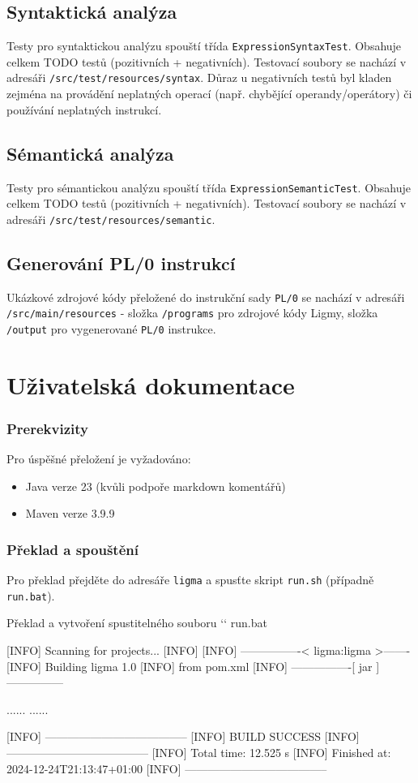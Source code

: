 \documentclass[czech, oth, kiv, he, iso690numb, viewonly]{fasthesis}
\begin{document}
\section{Syntaktická analýza}
Testy pro syntaktickou analýzu spouští třída \texttt{ExpressionSyntaxTest}. Obsahuje celkem TODO testů (pozitivních + negativních). Testovací
soubory se nachází v adresáři \texttt{/src/test/resources/syntax}. Důraz u negativních testů byl kladen zejména na provádění neplatných operací 
(např. chybějící operandy/operátory) či používání neplatných instrukcí. 
\section{Sémantická analýza}
Testy pro sémantickou analýzu spouští třída \texttt{ExpressionSemanticTest}. Obsahuje celkem TODO testů (pozitivních + negativních).
Testovací soubory se nachází v adresáři \texttt{/src/test/resources/semantic}.
\section{Generování PL/0 instrukcí}
Ukázkové zdrojové kódy přeložené do instrukční sady \texttt{PL/0} se nachází v adresáři \texttt{/src/main/resources} - složka \texttt{/programs}
pro zdrojové kódy Ligmy, složka \texttt{/output} pro vygenerované \texttt{PL/0} instrukce.

\chapter{Uživatelská dokumentace}
\subsection{Prerekvizity}
Pro úspěšné přeložení je vyžadováno:
\begin{itemize}
    \item Java verze 23 (kvůli podpoře markdown komentářů)
    \item Maven verze 3.9.9
\end{itemize}

\subsection{Překlad a spouštění}
Pro překlad přejděte do adresáře \texttt{ligma} a spusťte skript \texttt{run.sh} (případně \texttt{run.bat}).

\begin{console}{Překlad a vytvoření spustitelného souboru}
`\winprompt` run.bat

[INFO] Scanning for projects...
[INFO]
[INFO] ----------------< ligma:ligma >-------
[INFO] Building ligma 1.0
[INFO]   from pom.xml
[INFO] ----------------[ jar ]---------------

......
......

[INFO] --------------------------------------
[INFO] BUILD SUCCESS
[INFO] --------------------------------------
[INFO] Total time:  12.525 s
[INFO] Finished at: 2024-12-24T21:13:47+01:00
[INFO] --------------------------------------
\end{console}
\end{document}
